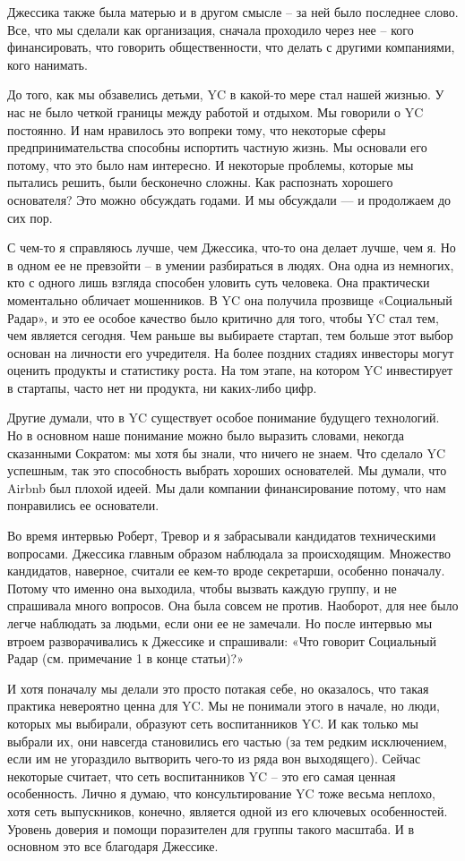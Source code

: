 \documentclass[ebook,12pt,oneside,openany]{memoir}
\begin{document}
Джессика также была матерью и в другом смысле – за ней было последнее
слово. Все, что мы сделали как организация, сначала проходило через
нее – кого финансировать, что говорить общественности, что делать с
другими компаниями, кого нанимать.

До того, как мы обзавелись детьми, YC в какой-то мере стал нашей
жизнью. У нас не было четкой границы между работой и отдыхом. Мы
говорили о YC постоянно. И нам нравилось это вопреки тому, что
некоторые сферы предпринимательства способны испортить частную жизнь.
Мы основали его потому, что это было нам интересно. И некоторые
проблемы, которые мы пытались решить, были бесконечно сложны. Как
распознать хорошего основателя? Это можно обсуждать годами. И мы
обсуждали — и продолжаем до сих пор.

С чем-то я справляюсь лучше, чем Джессика, что-то она делает лучше,
чем я. Но в одном ее не превзойти – в умении разбираться в людях. Она
одна из немногих, кто с одного лишь взгляда способен уловить суть
человека. Она практически моментально обличает мошенников. В YC она
получила прозвище «Социальный Радар», и это ее особое качество было
критично для того, чтобы YC стал тем, чем является сегодня. Чем раньше
вы выбираете стартап, тем больше этот выбор основан на личности его
учредителя. На более поздних стадиях инвесторы могут оценить продукты
и статистику роста. На том этапе, на котором YC инвестирует в
стартапы, часто нет ни продукта, ни каких-либо цифр.

Другие думали, что в YC существует особое понимание будущего
технологий. Но в основном наше понимание можно было выразить словами,
некогда сказанными Сократом: мы хотя бы знали, что ничего не знаем.
Что сделало YC успешным, так это способность выбрать хороших
основателей. Мы думали, что Airbnb был плохой идеей. Мы дали компании
финансирование потому, что нам понравились ее основатели.

Во время интервью Роберт, Тревор и я забрасывали кандидатов
техническими вопросами. Джессика главным образом наблюдала за
происходящим. Множество кандидатов, наверное, считали ее кем-то вроде
секретарши, особенно поначалу. Потому что именно она выходила, чтобы
вызвать каждую группу, и не спрашивала много вопросов. Она была совсем
не против. Наоборот, для нее было легче наблюдать за людьми, если они
ее не замечали. Но после интервью мы втроем разворачивались к Джессике
и спрашивали: «Что говорит Социальный Радар (см. примечание 1 в конце
статьи)?»

И хотя поначалу мы делали это просто потакая себе, но оказалось, что
такая практика невероятно ценна для YC. Мы не понимали этого в начале,
но люди, которых мы выбирали, образуют сеть воспитанников YC. И как
только мы выбрали их, они навсегда становились его частью (за тем
редким исключением, если им не угораздило вытворить чего-то из ряда
вон выходящего). Сейчас некоторые считает, что сеть воспитанников YC –
это его самая ценная особенность. Лично я думаю, что консультирование
YC тоже весьма неплохо, хотя сеть выпускников, конечно, является одной
из его ключевых особенностей. Уровень доверия и помощи поразителен для
группы такого масштаба. И в основном это все благодаря Джессике.
\end{document}
